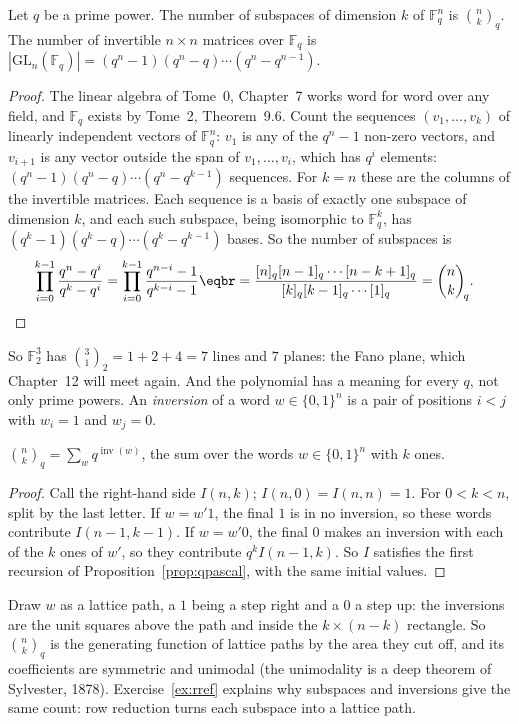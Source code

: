 \begin{theorem}\label{thm:subspaces}
Let $q$ be a prime power. The number of subspaces of dimension $k$ of $\mathbb F_q^n$ is $\binom nk_q$. The number of invertible $n\times n$
matrices over $\mathbb F_q$ is $|\mathrm{GL}_n(\mathbb F_q)|=(q^n-1)(q^n-q)\cdots(q^n-q^{n-1})$.
\end{theorem}
\begin{proof}
The linear algebra of Tome~0, Chapter~7 works word for word over any field, and $\mathbb F_q$ exists by Tome~2, Theorem~9.6. Count the
sequences $(v_1,\dots,v_k)$ of linearly independent vectors of $\mathbb F_q^n$: $v_1$ is any of the $q^n-1$ non-zero vectors, and $v_{i+1}$ is any vector
outside the span of $v_1,\dots,v_i$, which has $q^i$ elements: $(q^n-1)(q^n-q)\cdots(q^n-q^{k-1})$ sequences. For $k=n$ these are the columns of the
invertible matrices. Each sequence is a basis of exactly one subspace of dimension $k$, and each such subspace, being isomorphic
to $\mathbb F_q^k$, has $(q^k-1)(q^k-q)\cdots(q^k-q^{k-1})$ bases. So the number of subspaces is
\[
\begin{aligned}{}&\prod_{i=0}^{k-1}\frac{q^n-q^i}{q^k-q^i}=\prod_{i=0}^{k-1}\frac{q^{n-i}-1}{q^{k-i}-1}\eqbr=\frac{[n]_q[n-1]_q\cdots[n-k+1]_q}{[k]_q[k-1]_q\cdots[1]_q}=\binom nk_{\!q}.\end{aligned}
\]
\end{proof}

So $\mathbb F_2^3$ has $\binom31_2=1+2+4=7$ lines and $7$ planes: the Fano plane, which Chapter~12 will meet again. And the polynomial has
a meaning for every $q$, not only prime powers. An \emph{inversion} of a word $w\in\{0,1\}^n$ is a pair of positions $i<j$ with $w_i=1$ and $w_j=0$.

\begin{theorem}\label{thm:qinv}
$\displaystyle\binom nk_{\!q}=\sum_wq^{\operatorname{inv}(w)}$, the sum over the words $w\in\{0,1\}^n$ with $k$ ones.
\end{theorem}
\begin{proof}
Call the right-hand side $I(n,k)$; $I(n,0)=I(n,n)=1$. For $0<k<n$, split by the last letter. If $w=w'1$, the final $1$ is in no inversion,
so these words contribute $I(n-1,k-1)$. If $w=w'0$, the final $0$ makes an inversion with each of the $k$ ones of $w'$, so they contribute
$q^kI(n-1,k)$. So $I$ satisfies the first recursion of Proposition~\ref{prop:qpascal}, with the same initial values.
\end{proof}

Draw $w$ as a lattice path, a $1$ being a step right and a $0$ a step up: the inversions are the unit squares above the path
and inside the $k\times(n-k)$ rectangle. So $\binom nk_q$ is the generating function of lattice paths by the area they cut off, and its
coefficients are symmetric and unimodal (the unimodality is a deep theorem of Sylvester, 1878). Exercise~\ref{ex:rref} explains
why subspaces and inversions give the same count: row reduction turns each subspace into a lattice path.

